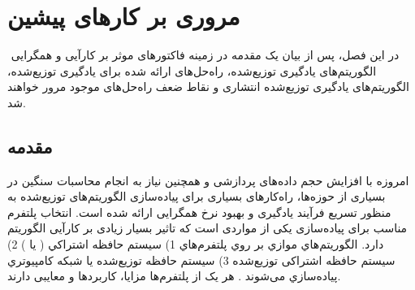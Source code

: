 \chapter{مروری بر کارهای پیشین}
\newpage
‎\renewcommand{\baselinestretch}{2}\normalsize‎
\label{Previous works_2}
در این فصل، پس از بیان یک مقدمه در زمینه فاکتورهای موثر بر کارآیی و همگرایی الگوریتم‌های یادگیری توزیع‌شده، راه‌حل‌های ارائه شده برای یادگیری توزیع‌شده، الگوریتم‌های یادگیری توزیع‌شده انتشاری و نقاط ضعف راه‌حل‌های موجود مرور خواهند شد. 

\section{مقدمه}
امروزه با افزایش حجم داده‌های پردازشی و همچنین نیاز به انجام محاسبات سنگین در بسیاری از حوزه‌ها، راه‌کارهای بسیاری برای پیاده‌سازی الگوریتم‌های توزیع‌شده به منظور تسریع فرآیند یادگیری و بهبود نرخ همگرایی ارائه شده است. انتخاب پلتفرم مناسب برای پیاده‌سازی یکی از مواردی است که تاثیر بسیار زیادی بر کارآیی الگوریتم دارد. الگوريتم‌هاي موازي بر روي پلتفرم‌هاي 1) سيستم حافظه اشتراكي ( يا ) 2) سیستم حافظه اشتراکی توزیع‌شده 3) سیستم حافظه توزیع‌شده یا شبكه كامپيوتري پياده‌سازي می‌شوند \cite{lian2019}. هر یک از پلتفرم‌ها مزایا، کاربردها و معایبی دارند. 

